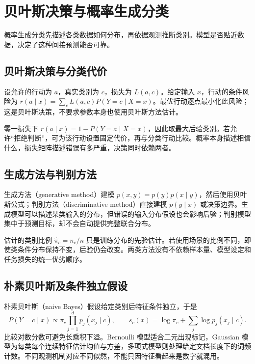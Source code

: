 \setcounter{chapter}{8} %
\chapter{贝叶斯决策与概率生成分类}
\label{chap:ml-generative}

概率生成分类先描述各类数据如何分布，再依据观测推断类别。模型是否贴近数据，决定了这种间接预测能否可靠。

\section{贝叶斯决策与分类代价}

设允许的行动为 $a$，真实类别为 $c$，损失为 $L(a,c)$。给定输入 $x$，行动的条件风险为 $r(a\mid x)=\sum_cL(a,c)P(Y=c\mid X=x)$。最优行动逐点最小化此风险；这是贝叶斯决策，不要求参数本身也使用贝叶斯方法估计。

零一损失下 $r(a\mid x)=1-P(Y=a\mid X=x)$，因此取最大后验类别。若允许“拒绝判断”，可为该行动设置固定代价，再与分类行动比较。概率本身描述相信什么，损失矩阵描述错误有多严重，决策同时依赖两者。

\section{生成方法与判别方法}

生成方法（generative method）建模 $p(x,y)=p(y)p(x\mid y)$，然后使用贝叶斯公式；判别方法（discriminative method）直接建模 $p(y\mid x)$ 或决策边界。生成模型可以描述某类输入的分布，但错误的输入分布假设也会影响后验；判别模型集中于预测目标，却不会自动提供完整联合分布。

估计的类别比例 $\widehat\pi_c=n_c/n$ 只是训练分布的先验估计。若使用场景的比例不同，即使类条件分布保持不变，后验仍会改变。两类方法没有不依赖样本量、模型设定和任务损失的统一优劣顺序。

\section{朴素贝叶斯及条件独立假设}

朴素贝叶斯（naive Bayes）假设给定类别后特征条件独立，于是
\[
 P(Y=c\mid x)\propto\pi_c\prod_{j=1}^d p_j(x_j\mid c),\qquad
 s_c(x)=\log\pi_c+\sum_j\log p_j(x_j\mid c).
\]
比较对数分数可避免长乘积下溢。Bernoulli 模型适合二元出现标记，Gaussian 模型为每类每个连续特征估计均值与方差，多项式模型则处理给定文档长度下的词频计数。不同观测机制对应不同似然，不能只因特征看起来是数字就混用。

